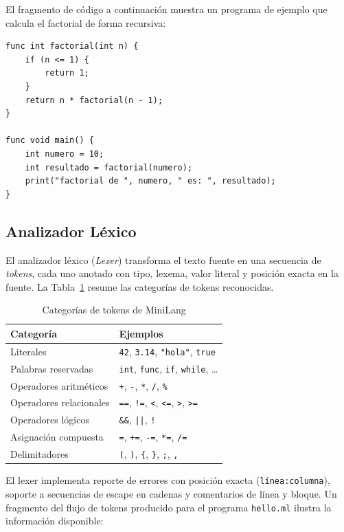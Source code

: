 \documentclass[conference]{IEEEtran}
\begin{document}
El fragmento de código a continuación muestra un programa de ejemplo que calcula el factorial de forma recursiva:

\begin{lstlisting}[language=MiniLang, caption={factorial.ml -- programa de prueba en MiniLang}]
func int factorial(int n) {
    if (n <= 1) {
        return 1;
    }
    return n * factorial(n - 1);
}

func void main() {
    int numero = 10;
    int resultado = factorial(numero);
    print("factorial de ", numero, " es: ", resultado);
}
\end{lstlisting}

\subsection{Analizador Léxico}

El analizador léxico (\textit{Lexer}) transforma el texto fuente en una secuencia de \textit{tokens}, cada uno anotado con tipo, lexema, valor literal y posición exacta en la fuente. La Tabla~\ref{tab:tokens} resume las categorías de tokens reconocidas.

\begin{table}[h]
\caption{Categorías de tokens de MiniLang}
\label{tab:tokens}
\centering
\begin{tabular}{ll}
\hline
\textbf{Categoría} & \textbf{Ejemplos} \\
\hline
Literales & \texttt{42}, \texttt{3.14}, \texttt{"hola"}, \texttt{true} \\
Palabras reservadas & \texttt{int}, \texttt{func}, \texttt{if}, \texttt{while}, \ldots \\
Operadores aritméticos & \texttt{+}, \texttt{-}, \texttt{*}, \texttt{/}, \texttt{\%} \\
Operadores relacionales & \texttt{==}, \texttt{!=}, \texttt{<}, \texttt{<=}, \texttt{>}, \texttt{>=} \\
Operadores lógicos & \texttt{\&\&}, \texttt{||}, \texttt{!} \\
Asignación compuesta & \texttt{=}, \texttt{+=}, \texttt{-=}, \texttt{*=}, \texttt{/=} \\
Delimitadores & \texttt{(}, \texttt{)}, \texttt{\{}, \texttt{\}}, \texttt{;}, \texttt{,} \\
\hline
\end{tabular}
\end{table}

El lexer implementa reporte de errores con posición exacta (\texttt{línea:columna}), soporte a secuencias de escape en cadenas y comentarios de línea y bloque. Un fragmento del flujo de tokens producido para el programa \texttt{hello.ml} ilustra la información disponible:
\end{document}
